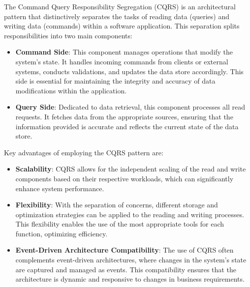 The Command Query Responsibility Segregation (CQRS) is an architectural pattern
that distinctively separates the tasks of reading data (queries) and writing
data (commands) within a software application. This separation splits
responsibilities into two main components:

\begin{itemize}
\item \textbf{Command Side}: This component manages operations that modify the
system's state. It handles incoming commands from clients or external systems,
conducts validations, and updates the data store accordingly. This side is
essential for maintaining the integrity and accuracy of data modifications
within the application.
\item \textbf{Query Side}: Dedicated to data retrieval, this component processes
all read requests. It fetches data from the appropriate sources, ensuring that
the information provided is accurate and reflects the current state of the data
store.
\end{itemize}

Key advantages of employing the CQRS pattern are:

\begin{itemize}
\item \textbf{Scalability}: CQRS allows for the independent scaling of the read
and write components based on their respective workloads, which can
significantly enhance system performance.
\item \textbf{Flexibility}: With the separation of concerns, different storage
and optimization strategies can be applied to the reading and writing processes.
This flexibility enables the use of the most appropriate tools for each
function, optimizing efficiency.
\item \textbf{Event-Driven Architecture Compatibility}: The use of CQRS often
complements event-driven architectures, where changes in the system's state are
captured and managed as events. This compatibility ensures that the architecture
is dynamic and responsive to changes in business requirements.
\end{itemize}

